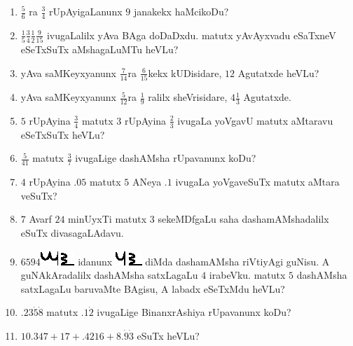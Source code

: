 \begin{enumerate}
\item $\frac{5}{6}$ ra $\frac{3}{4}$ rUpAyigaLanunx $9$ janakekx
haMcikoDu?

\item $\frac{1}{5} \frac{3}{4} \frac{1}{2} \frac{9}{15}$ ivugaLalilx
yAva BAga doDaDxdu. matutx yAvAyxvadu eSaTxneV eSeTxSuTx aMshagaLuMTu
heVLu?

\item yAva saMKeyxyanunx $\frac{7}{14}$ra $\frac{6}{15}$kekx kUDisidare,
$12$ Agutatxde heVLu?

\item yAva saMKeyxyanunx $\frac{5}{12}$ra $\frac{1}{9}$ ralilx
sheVrisidare, $4 \frac{1}{3}$ Agutatxde.

\item $5$ rUpAyina $\frac{3}{4}$ matutx $3$ rUpAyina $\frac{2}{3}$
ivugaLa yoVgavU matutx aMtaravu eSeTxSuTx heVLu?

\item $\frac{5}{41}$ matutx $\frac{3}{7}$ ivugaLige dashAMsha
rUpavanunx koDu?

\item $4$ rUpAyina $.05$ matutx $5$ ANeya $.1$ ivugaLa yoVgaveSuTx
matutx aMtara veSuTx?

\item $7$ Avarf $24$ minUyxTi matutx $3$ sekeMDfgaLu saha
dashamAMshadalilx eSuTx divasagaLAdavu.

\item
$6594$\includegraphics{images/mu.eps} \includegraphics{images/R.eps}
idanunx \includegraphics{images/u.eps} \includegraphics{images/R.eps}
diMda dashamAMsha riVtiyAgi guNisu. A guNAkAradalilx dashAMsha
satxLagaLu $4$ irabeVku. matutx $5$ dashAMsha satxLagaLu baruvaMte
BAgisu, A labadx eSeTxMdu heVLu?

\item $.23\dot 5\dot 8$ matutx $.1\dot 2$ ivugaLige BinanxrAshiya
rUpavanunx koDu?

\item $10.347+ 17+ .4216+8.\dot 9 \dot 3$ eSuTx heVLu?


\end{enumerate}
